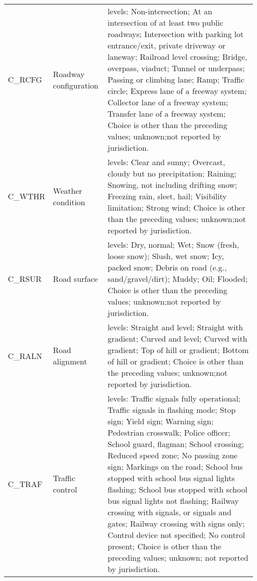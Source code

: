 \documentclass[]{elsarticle} %
\begin{document}
\begin{longtable}[t]{ll>{\raggedright\arraybackslash}p{32em}}
\rowcolor{gray!6}  C\_RCFG & Roadway configuration & 15 levels: Non-intersection; At an intersection of at least two public roadways; Intersection with parking lot entrance/exit, private driveway or laneway; Railroad level crossing; Bridge, overpass, viaduct; Tunnel or underpass; Passing or climbing lane; Ramp; Traffic circle; Express lane of a freeway system; Collector lane of a freeway system; Transfer lane of a freeway system; Choice is other than the preceding values; unknown;not reported by jurisdiction.\\
C\_WTHR & Weather condition & 10 levels: Clear and sunny; Overcast, cloudy but no precipitation; Raining; Snowing, not including drifting snow; Freezing rain, sleet, hail; Visibility limitation; Strong wind; Choice is other than the preceding values; unknown;not reported by jurisdiction.\\
\addlinespace
\rowcolor{gray!6}  C\_RSUR & Road surface & 12 levels: Dry, normal; Wet; Snow (fresh, loose snow); Slush, wet snow; Icy, packed snow; Debris on road (e.g., sand/gravel/dirt); Muddy; Oil; Flooded; Choice is other than the preceding values; unknown;not reported by jurisdiction.\\
C\_RALN & Road alignment & 9 levels: Straight and level; Straight with gradient; Curved and level; Curved with gradient; Top of hill or gradient; Bottom of hill or gradient; Choice is other than the preceding values; unknown;not reported by jurisdiction.\\
\rowcolor{gray!6}  C\_TRAF & Traffic control & 21 levels: Traffic signals fully operational; Traffic signals in flashing mode; Stop sign; Yield sign; Warning sign; Pedestrian crosswalk; Police officer; School guard, flagman; School crossing; Reduced speed zone; No passing zone sign; Markings on the road; School bus stopped with school bus signal lights flashing; School bus stopped with school bus signal lights not flashing; Railway crossing with signals, or signals and gates; Railway crossing with signs only; Control device not specified; No control present; Choice is other than the preceding values; unknown; not reported by jurisdiction.\\*
\end{longtable}
\endgroup{}

\begingroup\fontsize{7}{9}\selectfont
\end{document}
